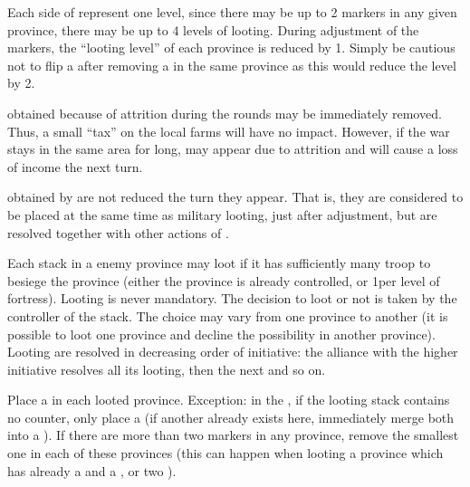 \begin{designnote}
  Each side of \PILLAGE represent one level, since there may be up to 2
  markers in any given province, there may be up to 4 levels of
  looting. During adjustment of the markers, the ``looting level'' of each
  province is reduced by 1. Simply be cautious not to flip a \PILLAGE\Faceplus
  after removing a \PILLAGE\Facemoins in the same province as this would
  reduce the level by 2.

  \smallskip

  \PILLAGE obtained because of attrition during the rounds may be immediately
  removed. Thus, a small ``tax'' on the local farms will have no
  impact. However, if the war stays in the same area for long,
  \PILLAGE\Faceplus may appear due to attrition and will cause a loss of
  income the next turn.

  \smallskip

  \PILLAGE obtained by \corsaire are not reduced the turn they appear. That
  is, they are considered to be placed at the same time as military looting,
  just after adjustment, but are resolved together with other actions of
  \corsaire.
\end{designnote}

\aparag[Looting]
\bparag Each stack in a enemy province may loot if it has sufficiently many
troop to besiege the province (either the province is already controlled, or
1\LD per level of fortress).
\bparag Looting is never mandatory.
\bparag The decision to loot or not is taken by the controller of the
stack. The choice may vary from one province to another (it is possible to
loot one province and decline the possibility in another province).
\bparag Looting are resolved in decreasing order of initiative: the alliance
with the higher initiative resolves all its looting, then the next and so on.

\bparag Place a \PILLAGE\Faceplus in each looted province.
\bparag Exception: in the \ROTW, if the looting stack contains no \ARMY
counter, only place a \PILLAGE\Facemoins (if another already exists here,
immediately merge both into a \PILLAGE\Faceplus).
\bparag If there are more than two \PILLAGE markers in any province, remove
the smallest one in each of these provinces (this can happen when looting a
province which has already a \PILLAGE\Faceplus and a \PILLAGE\Facemoins, or
two \PILLAGE\Faceplus).

